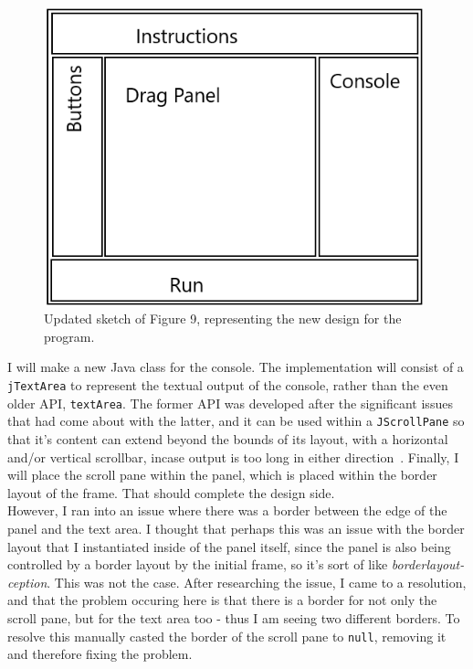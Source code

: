 \documentclass[a4paper, 12pt]{article}
\begin{document}
            \begin{figure}[h]
                \centering
                \includegraphics[width=110mm]{design_updated.png}
                \caption{Updated sketch of Figure 9, representing the new design for the program.}
            \end{figure}

            I will make a new Java class for the console. The implementation will consist of a \texttt{jTextArea}
            to represent the textual output of the console, rather than the even older API, \texttt{textArea}.
            The former API was developed after the significant issues that had come about with the latter,
            and it can be used within a \texttt{JScrollPane} so that it's content can extend beyond the
            bounds of its layout, with a horizontal and/or vertical scrollbar, incase output is too long
            in either direction~\cite{jTextArea}. Finally, I will place the scroll pane within the panel, which
            is placed within the border layout of the frame. That should complete the design side. \\

            However, I ran into an issue where there was a border between the edge of the panel and the text area. I thought
            that perhaps this was an issue with the border layout that I instantiated inside of the panel itself,
            since the panel is also being controlled by a border layout by the initial frame, so it's sort of like
            \textit{borderlayout-ception}. This was not the case. After researching the issue, I came to a
            resolution, and that the problem occuring here is that there is a border for not only the scroll pane,
            but for the text area too - thus I am seeing two different borders. To resolve this manually casted the
            border of the scroll pane to \texttt{null}, removing it and therefore fixing the problem.
\end{document}
